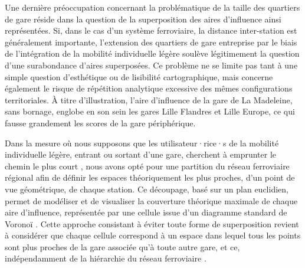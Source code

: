 \begin{refsegment}
Une dernière préoccupation concernant la problématique de la taille des quartiers de gare réside dans la question de la superposition des aires d'influence ainsi représentées. Si, dans le cas d’un système ferroviaire, la distance inter-station est généralement importante, l’extension des quartiers de gare entreprise par le biais de l’intégration de la mobilité individuelle légère soulève légitimement la question d’une surabondance d’aires superposées. Ce problème ne se limite pas tant à une simple question d'esthétique ou de lisibilité cartographique, mais concerne également le risque de répétition analytique excessive des mêmes configurations territoriales. À titre d’illustration, l’aire d’influence  de la gare de La Madeleine, sans bornage, englobe en son sein les gares Lille Flandres et Lille Europe, ce qui fausse grandement les scores de la gare périphérique.%

Dans la mesure où nous supposons que les utilisateur·rice·s de la mobilité individuelle légère, entrant ou sortant d'une gare, cherchent à emprunter le chemin le plus court \textcolor{blue}{\autocite[116]{heran_distances_2009}}, nous avons opté pour une partition du réseau ferroviaire régional afin de définir les espaces théoriquement les plus proches, d'un point de vue géométrique, de chaque station. Ce découpage, basé sur un plan euclidien, permet de modéliser et de visualiser la couverture théorique maximale de chaque aire d'influence, représentée par une cellule issue d’un diagramme standard de Voronoï \textcolor{blue}{\autocite[479]{mota_method_2014}}. Cette approche consistant à éviter toute forme de superposition revient à considérer que chaque cellule correspond à un espace dans lequel tous les points sont plus proches de la gare associée qu’à toute autre gare, et ce, indépendamment de la hiérarchie du réseau ferroviaire \textcolor{blue}{\autocite[429]{lebedeva_increasing_2018}}.%


\end{refsegment}
